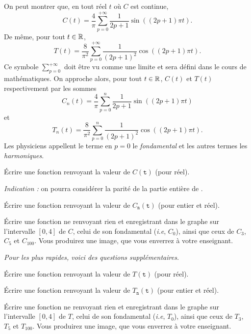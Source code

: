 On peut montrer que, en tout réel $t$ où $C$ est continue, 
\begin{equation*}
  C(t) = \dfrac{4}{\pi}\sum_{p=0}^{+\infty} \dfrac{1}{2p+1} \sin((2p+1)\pi t).
\end{equation*}
De même, pour tout $t\in\mathbb{R}$, 
\begin{equation*}
  T(t) = \dfrac{8}{\pi^2}\sum_{p=0}^{+\infty} \dfrac{1}{(2p+1)^2} \cos((2p+1)\pi t).
\end{equation*}
Ce symbole $\displaystyle \sum_{p=0}^{+\infty}$ doit être vu comme une limite et sera défini dans le cours de mathématiques. 
On approche alors, pour tout $t\in\mathbb{R}$, $C(t)$ et $T(t)$ respectivement par les sommes 
\begin{equation*}
  C_n(t) = \dfrac{4}{\pi}\sum_{p=0}^{n} \dfrac{1}{2p+1} \sin((2p+1)\pi t)
\end{equation*}
et 
\begin{equation*}
   T_n(t) = \dfrac{8}{\pi^2}\sum_{p=0}^{n} \dfrac{1}{(2p+1)^2} \cos((2p+1)\pi t).
\end{equation*}
Les physiciens appellent le terme en $p=0$ le \emph{fondamental} et les autres termes les \emph{harmoniques}. 


\medskip{}

\question{} \'Ecrire une fonction  renvoyant la valeur de $C(\texttt{t})$ (pour  réel). 

\emph{Indication :} on pourra considérer la parité de la partie entière de .


\medskip{}

\question{} \'Ecrire une fonction  renvoyant la valeur de $C_{\texttt{n}}(\texttt{t})$ (pour  entier et  réel). 


\medskip{}

\question{}\label{tp05:qu:creneau} \'Ecrire une fonction  ne renvoyant rien 
et enregistrant dans  le graphe sur l'intervalle $[0,4]$ de $C$, celui 
de son fondamental (\emph{i.e}, $C_0$), ainsi que ceux de $C_3$, $C_5$ et $C_{100}$.
Vous produirez une image, que vous enverrez à votre enseignant. 

\bigskip

\emph{Pour les plus rapides, voici des questions supplémentaires.}

\bigskip



\question{} \'Ecrire une fonction  renvoyant la valeur de $T(\texttt{t})$ (pour 
 réel).


\medskip{}

\question{} \'Ecrire une fonction  renvoyant la valeur de $T_{\texttt{n}}(\texttt{t})$ (pour  entier et  réel). 


\medskip{}

\question{}\label{tp05:qu:triangle} \'Ecrire une fonction  ne renvoyant rien et enregistrant dans  le graphe sur l'intervalle $[0,4]$ de $T$, celui de son fondamental (\emph{i.e}, $T_0$), ainsi que ceux de $T_3$, $T_5$ et $T_{100}$.
Vous produirez une image, que vous enverrez à votre enseignant. 
